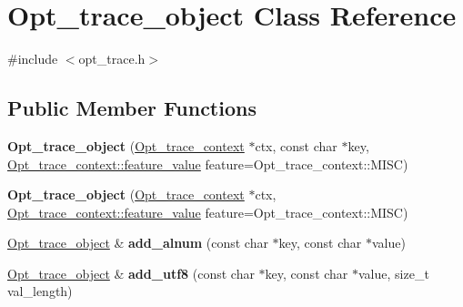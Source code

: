 \hypertarget{classOpt__trace__object}{}\section{Opt\+\_\+trace\+\_\+object Class Reference}
\label{classOpt__trace__object}


{\ttfamily \#include $<$opt\+\_\+trace.\+h$>$}

\subsection*{Public Member Functions}
\begin{DoxyCompactItemize}
\item 
\mbox{\label{classOpt__trace__object_aa6ae50b3cd964e1887e4c3afed89225a}} 
{\bfseries Opt\+\_\+trace\+\_\+object} (\mbox{\hyperlink{classOpt__trace__context}{Opt\+\_\+trace\+\_\+context}} $\ast$ctx, const char $\ast$key, \mbox{\hyperlink{classOpt__trace__context_a71428b27f932674f6b2535ee6c30845c}{Opt\+\_\+trace\+\_\+context\+::feature\+\_\+value}} feature=Opt\+\_\+trace\+\_\+context\+::\+M\+I\+SC)
\item 
\mbox{\label{classOpt__trace__object_a05d024e952adcaf1a7476498a71cc610}} 
{\bfseries Opt\+\_\+trace\+\_\+object} (\mbox{\hyperlink{classOpt__trace__context}{Opt\+\_\+trace\+\_\+context}} $\ast$ctx, \mbox{\hyperlink{classOpt__trace__context_a71428b27f932674f6b2535ee6c30845c}{Opt\+\_\+trace\+\_\+context\+::feature\+\_\+value}} feature=Opt\+\_\+trace\+\_\+context\+::\+M\+I\+SC)
\item 
\mbox{\label{classOpt__trace__object_a18f15a6a19f2252919c096e2e630e593}} 
\mbox{\hyperlink{classOpt__trace__object}{Opt\+\_\+trace\+\_\+object}} \& {\bfseries add\+\_\+alnum} (const char $\ast$key, const char $\ast$value)
\item 
\mbox{\label{classOpt__trace__object_ad1f77b3c0abf9c45322f9e6ab281adbf}} 
\mbox{\hyperlink{classOpt__trace__object}{Opt\+\_\+trace\+\_\+object}} \& {\bfseries add\+\_\+utf8} (const char $\ast$key, const char $\ast$value, size\+\_\+t val\+\_\+length)
\item 
\mbox{\label{classOpt__trace__object_a71c3897890a610bd7377e6743637ec8e}} 

\end{DoxyCompactItemize}
